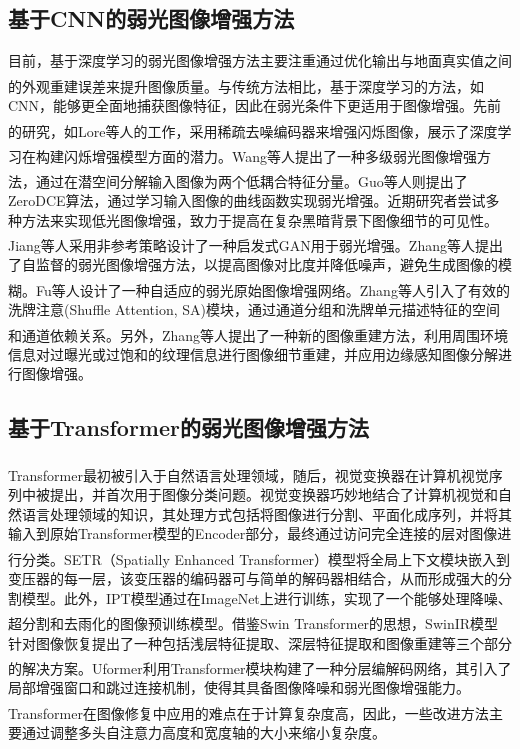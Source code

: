 \documentclass[a4paper]{ctexart}
\newcommand{\upcite}[1]{\rmfamily\textsuperscript{\textsuperscript{\cite{#1}}}}
\begin{document}
\subsection{基于CNN的弱光图像增强方法}

目前，基于深度学习的弱光图像增强方法主要注重通过优化输出与地面真实值之间的外观重建误差来提升图像质量\upcite{cai2018learning, guo2020zero}。与传统方法相比，基于深度学习的方法，如CNN，能够更全面地捕获图像特征，因此在弱光条件下更适用于图像增强。先前的研究，如Lore等人的工作\upcite{moon2013robust, lore2017llnet}，采用稀疏去噪编码器来增强闪烁图像，展示了深度学习在构建闪烁增强模型方面的潜力。Wang等人\upcite{wang2019low}提出了一种多级弱光图像增强方法，通过在潜空间分解输入图像为两个低耦合特征分量。Guo等人\upcite{guo2020zero}则提出了ZeroDCE算法，通过学习输入图像的曲线函数实现弱光增强。近期研究者尝试多种方法来实现低光图像增强，致力于提高在复杂黑暗背景下图像细节的可见性。Jiang等人\upcite{jiang2021enlightengan}采用非参考策略设计了一种启发式GAN用于弱光增强。Zhang等人\upcite{zhang2021self}提出了自监督的弱光图像增强方法，以提高图像对比度并降低噪声，避免生成图像的模糊。Fu等人\upcite{fu2020learning}设计了一种自适应的弱光原始图像增强网络。Zhang等人\upcite{zhang2021sa}引入了有效的洗牌注意(Shuffle Attention, SA)模块，通过通道分组和洗牌单元描述特征的空间和通道依赖关系。另外，Zhang等人\upcite{zhang2021deep}提出了一种新的图像重建方法，利用周围环境信息对过曝光或过饱和的纹理信息进行图像细节重建，并应用边缘感知图像分解进行图像增强。

\subsection{基于Transformer的弱光图像增强方法}

Transformer\upcite{vaswani2017attention}最初被引入于自然语言处理领域，随后，视觉变换器\upcite{dosovitskiy2020image}在计算机视觉序列中被提出，并首次用于图像分类问题。视觉变换器巧妙地结合了计算机视觉和自然语言处理领域的知识，其处理方式包括将图像进行分割、平面化成序列，并将其输入到原始Transformer模型的Encoder部分，最终通过访问完全连接的层对图像进行分类。SETR（Spatially Enhanced Transformer）\upcite{zheng2021rethinking}模型将全局上下文模块嵌入到变压器的每一层，该变压器的编码器可与简单的解码器相结合，从而形成强大的分割模型。此外，IPT模型通过在ImageNet上进行训练，实现了一个能够处理降噪、超分割和去雨化的图像预训练模型。借鉴Swin Transformer\upcite{liu2021swin}的思想，SwinIR模型针对图像恢复提出了一种包括浅层特征提取、深层特征提取和图像重建等三个部分的解决方案。Uformer\upcite{wang2022uformer}利用Transformer模块构建了一种分层编解码网络，其引入了局部增强窗口和跳过连接机制，使得其具备图像降噪和弱光图像增强能力。Transformer在图像修复中应用的难点在于计算复杂度高，因此，一些改进方法\upcite{wang2022ultrahighdefinition}主要通过调整多头自注意力高度和宽度轴的大小来缩小复杂度。
	
\end{document}
